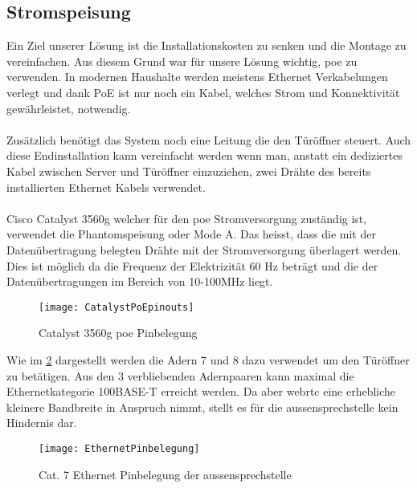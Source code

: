 \subsection{Stromspeisung}
\label{sec:poe}
Ein Ziel unserer Lösung ist die Installationskosten zu senken und die Montage zu vereinfachen. Aus diesem Grund war für unsere Lösung wichtig, \gls{poe} zu verwenden. In modernen Haushalte werden meistens Ethernet Verkabelungen verlegt und dank PoE ist nur noch ein Kabel, welches Strom und Konnektivität gewährleistet, notwendig.
\\
\\
Zusätzlich benötigt das System noch eine Leitung die den Türöffner steuert.
Auch diese Endinstallation kann vereinfacht werden wenn man, anstatt ein dediziertes Kabel zwischen Server und Türöffner einzuziehen,  zwei Drähte des bereits installierten Ethernet Kabels verwendet.
\\
\\
Cisco Catalyst 3560g welcher für den \gls{poe} Stromversorgung zuständig ist, verwendet die Phantomspeisung oder Mode A. Das heisst, dass die mit der Datenübertragung belegten Drähte mit der Stromversorgung überlagert werden. Dies ist möglich da die Frequenz der Elektrizität 60 Hz beträgt und die der Datenübertragungen im Bereich von 10-100MHz liegt.

\begin{figure}[htb!]
	\begin{center}
		\texttt{[image: CatalystPoEpinouts]}
		\caption[Catalyst Pinouts]{Catalyst 3560g \gls{poe} Pinbelegung}
		\label{fig:catalystPinouts}
	\end{center}
\end{figure}

Wie im \cref{fig:ethernetBelegung} dargestellt werden die Adern 7 und 8 dazu verwendet um den Türöffner zu betätigen. Aus den 3 verbliebenden Adernpaaren kann maximal die Ethernetkategorie 100BASE-T erreicht werden. Da aber \gls{webrtc} eine erhebliche kleinere Bandbreite in Anspruch nimmt, stellt es für die \gls{aussensprechstelle} kein Hindernis dar.

\begin{figure}[htb!]
	\begin{center}
		\texttt{[image: EthernetPinbelegung]}
		\caption[EthernetPinbelegung]{Cat. 7 Ethernet Pinbelegung der \gls{aussensprechstelle}}
		\label{fig:ethernetBelegung}
	\end{center}
\end{figure}



